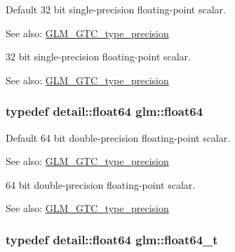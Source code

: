 Default 32 bit single-precision floating-point scalar. \begin{Desc}
\item[See also:]\hyperlink{group__gtc__type__precision}{GLM\_\-GTC\_\-type\_\-precision}\end{Desc}
32 bit single-precision floating-point scalar. \begin{Desc}
\item[See also:]\hyperlink{group__gtc__type__precision}{GLM\_\-GTC\_\-type\_\-precision} \end{Desc}
\hypertarget{group__gtc__type__precision_gb721f828b41f46b20cf4883b50733d3b}{
\subsubsection[float64]{\setlength{\rightskip}{0pt plus 5cm}typedef detail::float64 {\bf glm::float64}}}
\label{group__gtc__type__precision_gb721f828b41f46b20cf4883b50733d3b}


Default 64 bit double-precision floating-point scalar. \begin{Desc}
\item[See also:]\hyperlink{group__gtc__type__precision}{GLM\_\-GTC\_\-type\_\-precision}\end{Desc}
64 bit double-precision floating-point scalar. \begin{Desc}
\item[See also:]\hyperlink{group__gtc__type__precision}{GLM\_\-GTC\_\-type\_\-precision} \end{Desc}
\hypertarget{group__gtc__type__precision_gde966a3eb25ebeb16dd53c40d3fdeb46}{
\subsubsection[float64\_\-t]{\setlength{\rightskip}{0pt plus 5cm}typedef detail::float64 {\bf glm::float64\_\-t}}}
\label{group__gtc__type__precision_gde966a3eb25ebeb16dd53c40d3fdeb46}


